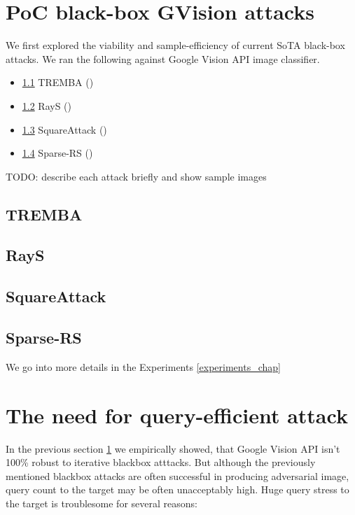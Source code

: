 \section{PoC black-box GVision attacks}
\label{poc_gvision_attacks}
We first explored the viability and sample-efficiency of current SoTA black-box attacks. We ran the following against Google Vision API image classifier.

\begin{itemize}
    \item \ref{tremba_poc} TREMBA (\cite{Huang2020BlackBoxAA})
    \item \ref{rays_poc} RayS (\cite{Chen2020RaySAR})
    \item \ref{square_poc} SquareAttack (\cite{Andriushchenko2020SquareAA})
    \item \ref{sparse_rs_poc} Sparse-RS (\cite{Croce2020SparseRSAV})
\end{itemize}

TODO: describe each attack briefly and show sample images

\subsection{TREMBA}
\label{tremba_poc}
\subsection{RayS}
\label{rays_poc}
\subsection{SquareAttack}
\label{square_poc}
\subsection{Sparse-RS}
\label{sparse_rs_poc}

We go into more details in the Experiments \ref{experiments_chap}


\section{The need for query-efficient attack}
In the previous section \ref{poc_gvision_attacks} we empirically showed, that Google Vision API isn't 100\% robust to iterative blackbox atttacks. But although the previously mentioned blackbox attacks are often successful in producing adversarial image, query count to the target may be often unacceptably high. Huge query stress to the target is troublesome for several reasons:

